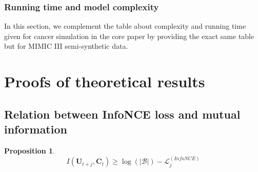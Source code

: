 \documentclass{article}
\theoremstyle{plain}
\newtheorem{proposition}[theorem]{Proposition}
\theoremstyle{definition}
\theoremstyle{remark}
\begin{document}
\subsubsection{Running time and model complexity}
In this section, we complement the table about complexity and running time given for cancer simulation in the core paper by providing the exact same table but for MIMIC III semi-synthetic data. 
\begin{table}[!htbp]
\caption{The number of parameters to train for each model after hyper-parameters fine-tuning and the corresponding running time averaged over five seeds. Results are reported for semi-synthetic MIMIC III data; the processing unit is GPU - 1 x NVIDIA Tesla M60 .}
\label{tab: complexity_running_time_mimic}
\vskip 0.15in
\begin{center}
\begin{small}
\begin{sc}
\end{sc}
\end{small} 
\end{center}
\vskip -0.1in
\end{table}

\section{Proofs of theoretical results}
\label{sect: proofs}
\subsection{Relation between InfoNCE loss and mutual information}

\begin{proposition}
    $$I(\mathbf{U}_{t+j}, \mathbf{C}_{t}) \geq \log(|\mathcal{B}|) - \mathcal{L}^{(InfoNCE)}_j$$
\end{proposition}
\end{document}
